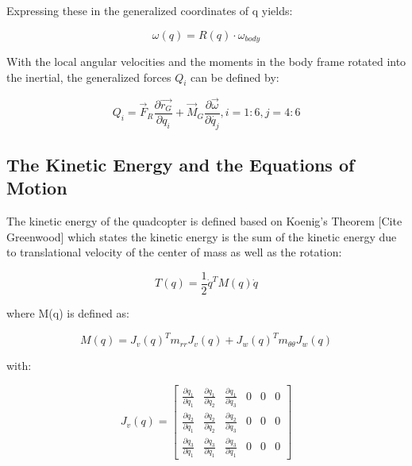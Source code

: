 \documentclass[10pt, letterpaper]{article}
\begin{document}
Expressing these in the generalized coordinates of q yields:

\[
\omega(q)=R(q)\cdot\omega_{body}
\]

With the local angular velocities and the moments in the body frame
rotated into the inertial, the generalized forces $Q_{i}$ can
be defined by:

\[
Q_{i}=\overrightarrow{F}_{R}\frac{\partial\overrightarrow{r_{G}}}{\partial q_{i}}+\overrightarrow{M}_{G}\frac{\partial\overrightarrow{\omega}}{\partial\dot{q_{j}}}, i=1:6, j=4:6
\]









\subsection*{The Kinetic Energy and the Equations of Motion}

The kinetic energy of the quadcopter is defined based on Koenig's Theorem [Cite Greenwood] which states the kinetic energy is the sum of the kinetic energy due to translational velocity of the center of mass as well as the rotation:

\[
T(q)=\frac{1}{2}\dot{q}^{T}M(q)\dot{q}
\]

where M(q) is defined as:

\[
M(q)=J_{v}(q)^{T}m_{rr}J_{v}(q)+J_{w}(q)^{T}m_{\theta\theta}J_{w}(q)
\]

with:

\[
J_{v}(q)=\left[\begin{array}{cccccc}
\frac{\partial q_{1}}{\partial q_{1}} & \frac{\partial q_{1}}{\partial q_{2}} & \frac{\partial q_{1}}{\partial q_{3}} & 0 & 0 & 0\\
\frac{\partial q_{2}}{\partial q_{1}} & \frac{\partial q_{2}}{\partial q_{2}} & \frac{\partial q_{2}}{\partial q_{3}} & 0 & 0 & 0\\
\frac{\partial q_{3}}{\partial q_{1}} & \frac{\partial q_{3}}{\partial q_{1}} & \frac{\partial q_{3}}{\partial q_{1}} & 0 & 0 & 0
\end{array}\right]
\]
\end{document}
